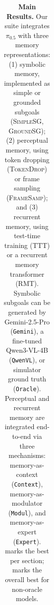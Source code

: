 \begin{table}[t]
{\begin{tabular}{>{\centering\arraybackslash}p{1.6cm}|l l  cccc|  cccc|  cccc|  cccc|  c}

\bottomrule
\end{tabular}}


\caption{
\textbf{Main Results.} Our \modelname\xspace suite integrates $\pi_{0.5}$ with three memory representations: (1) symbolic memory, implemented as simple or grounded subgoals (\textsc{SimpleSG}, \textsc{GroundSG}); (2) perceptual memory, using token dropping (\textsc{TokenDrop}) or frame sampling (\textsc{FrameSamp}); and (3) recurrent memory, using test-time training (\textsc{TTT}) or a recurrent memory transformer (\textsc{RMT}).
Symbolic subgoals can be generated by Gemini-2.5-Pro (\texttt{Gemini}), a fine-tuned Qwen3-VL-4B (\texttt{QwenVL}), or simulator ground truth (\texttt{Oracle}).
Perceptual and recurrent memory are integrated end-to-end via three mechanisms: memory-as-context (\texttt{Context}), memory-as-modulator (\texttt{Modul}), and memory-as-expert (\texttt{Expert}).
 marks the best per section; \text{\tiny \raisebox{1ex}{\bestbest{}}} marks the overall best for non-oracle models.
}
\label{tab:main}
\end{table}
